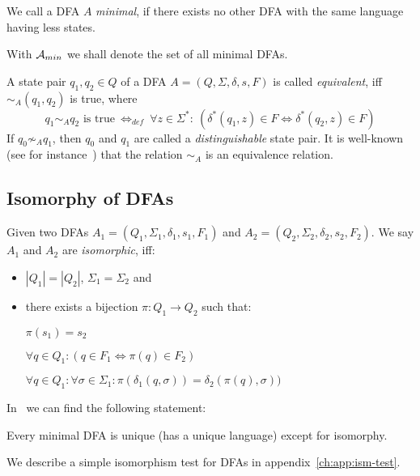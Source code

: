 \begin{definition}
	We call a DFA $A$ \emph{minimal}, if there exists no other DFA with the same language having less states.
\end{definition}
\noindent With ${\mathcal{A}_{min}}$ we shall denote the set of all minimal DFAs.

\begin{definition}\cite[p. 154]{HMU01}\label{ch:2:def:eq-dist-pairs}
	A state pair $q_1, q_2 \in Q$ of a DFA $A = (Q, \Sigma, \delta, s, F)$ is called \emph{equivalent}, iff $\sim_A(q_1, q_2)$ is true, where
	\begin{displaymath}
	q_1 \sim_A q_2 \text{ is true}\ \Leftrightarrow_{def}\ \forall z \in \Sigma^* \colon\ (\delta^*(q_1, z) \in F \Leftrightarrow \delta^*(q_2, z) \in F)
	\end{displaymath}
	If $q_0 \not\sim_A q_1$, then $q_0$ and $q_1$ are called a \emph{distinguishable} state pair. It is well-known (see for instance~\cite[p. 160]{HMU01}) that the relation $\sim_A$ is an equivalence relation.
\end{definition}

\subsection{Isomorphy of DFAs}\label{ch:2:sec:isom}

Given two DFAs $A_1 = (Q_1, \Sigma_1, \delta_1, s_1, F_1)$ and $A_2 = (Q_2, \Sigma_2, \delta_2, s_2, F_2)$. We say $A_1$ and $A_2$ are \emph{isomorphic}, iff:
\begin{itemize}
	\item $|Q_1| = |Q_2|$, $\Sigma_1 = \Sigma_2$ and
	\item there exists a bijection $\pi\colon Q_1 \to Q_2$ such that:
	
	$\pi(s_1) = s_2$
	
	$\forall q\in Q_1\colon (q\in F_1 \Longleftrightarrow \pi(q)\in F_2)$
	
	$\forall q\in Q_1\colon \forall\sigma\in\Sigma_1\colon \pi(\delta_1(q,\sigma))=\delta_2(\pi(q),\sigma))$
\end{itemize}
In~\cite[p. 45]{Sch01} we can find the following statement:
\begin{theorem}\label{ch:2:thm:uniq-ism}
	Every minimal DFA is unique (has a unique language) except for isomorphy.
\end{theorem}
\noindent We describe a simple isomorphism test for DFAs in appendix~\ref{ch:app:ism-test}.

